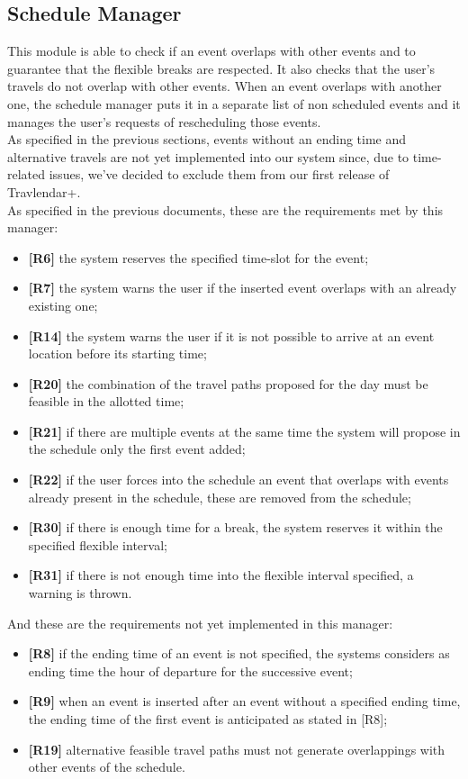 \subsection{Schedule Manager}
This module is able to check if an event overlaps with other events and to guarantee that the flexible breaks are respected. It also checks that the user's travels do not overlap with other events. When an event overlaps with another one, the schedule manager puts it in a separate list of non scheduled events and it manages the user's requests of rescheduling those events. \\
As specified in the previous sections, events without an ending time and alternative travels are not yet implemented into our system since, due to time-related issues, we've decided to exclude them from our first release of Travlendar+. \\
As specified in the previous documents, these are the requirements met by this manager:
\begin{itemize}
	\item \textbf{[R6]} the system reserves the specified time-slot for the event;
	\item \textbf{[R7]} the system warns the user if the inserted event overlaps with an already existing one;
	\item \textbf{[R14]} the system warns the user if it is not possible to arrive at an event location before its starting time;
	\item \textbf{[R20]} the combination of the travel paths proposed for the day must be feasible in the allotted time;
	\item \textbf{[R21]} if there are multiple events at the same time the system will propose in the schedule only the first event added;
	\item \textbf{[R22]} if the user forces into the schedule an event that overlaps with events already present in the schedule, these are removed from the schedule;
	\item \textbf{[R30]} if there is enough time for a break, the system reserves it within the specified flexible interval;
	\item \textbf{[R31]} if there is not enough time into the flexible interval specified, a warning is thrown.
\end{itemize}

And these are the requirements not yet implemented in this manager:
\begin{itemize}
	\item \textbf{[R8]} if the ending time of an event is not specified, the systems considers as ending time the hour of departure for the successive event;
	\item \textbf{[R9]} when an event is inserted after an event without a specified ending time, the ending time  of the first event is anticipated as stated in [R8];
	\item \textbf{[R19]} alternative feasible travel paths must not generate overlappings with other events of the schedule.
\end{itemize}

